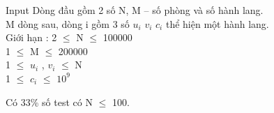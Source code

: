 Input
Dòng đầu gồm 2 số N, M – số phòng và số hành lang.   
\\   M dòng sau, dòng i gồm 3 số $u_{i}$   $v_{i}$   $c_{i}$   thể hiện một hành lang.   
\\Giới hạn :   2  $\le$  N  $\le$  100000   
\\   1  $\le$  M  $\le$  200000   
\\   1  $\le$  $u_{i}$   , $v_{i}$    $\le$  N   
\\   1  $\le$  $c_{i}$    $\le$  $10^{9}$

   Có 33\% số test có N  $\le$  100.
